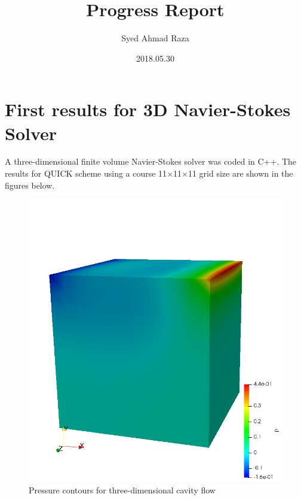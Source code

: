 \documentclass[12pt,a4paper,fleqn]{article}
\title{Progress Report}
\author{Syed Ahmad Raza}
\date{2018.05.30}
\begin{document}
\maketitle

\section{First results for 3D Navier-Stokes Solver}

A three-dimensional finite volume Navier-Stokes solver was coded in C++. The results for QUICK scheme using a course 11\(\times\)11\(\times\)11 grid size are shown in the figures below.

\begin{figure}[H]
    \centering
    \includegraphics[width=\linewidth]{3d_quick_pressure.png}
    \caption{Pressure contours for three-dimensional cavity flow}
\end{figure}
\end{document}
